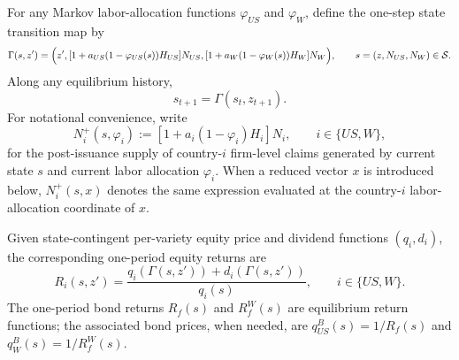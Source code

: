 \documentclass{article}
\begin{document}
For any Markov labor-allocation functions $\varphi_{US}$ and $\varphi_W$, define the one-step state transition map by
\begin{equation}\label{recursive_next_state}
\Gamma(s,z')
=
\Bigl(
 z',
 [1+a_{US}(1-\varphi_{US}(s))H_{US}]N_{US},
 [1+a_W(1-\varphi_W(s))H_W]N_W
\Bigr),
\qquad
s=(z,N_{US},N_W)\in\mathcal S.
\end{equation}
Along any equilibrium history,
\[
s_{t+1}=\Gamma(s_t,z_{t+1}).
\]
For notational convenience, write
\[
N_i^+(s,\varphi_i)
:=
[1+a_i(1-\varphi_i)H_i]N_i,
\qquad
i\in\{US,W\},
\]
for the post-issuance supply of country-$i$ firm-level claims generated by current state $s$ and current labor allocation $\varphi_i$. When a reduced vector $x$ is introduced below, $N_i^+(s,x)$ denotes the same expression evaluated at the country-$i$ labor-allocation coordinate of $x$.

Given state-contingent per-variety equity price and dividend functions $(q_i,d_i)$, the corresponding one-period equity returns are
\begin{equation}\label{recursive_returns}
R_i(s,z')
=
\frac{q_i(\Gamma(s,z'))+d_i(\Gamma(s,z'))}{q_i(s)},
\qquad
i\in\{US,W\}.
\end{equation}
The one-period bond returns $R_f(s)$ and $R_f^W(s)$ are equilibrium return functions; the associated bond prices, when needed, are $q^B_{US}(s)=1/R_f(s)$ and $q^B_W(s)=1/R_f^W(s)$.
\end{document}
